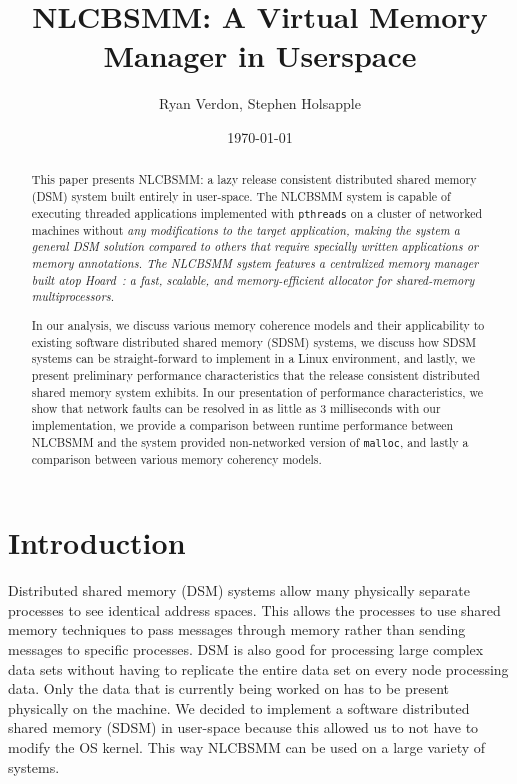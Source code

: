\documentclass[10pt,conference]{IEEEtran}
\begin{document}
\title{\vfill NLCBSMM: A Virtual Memory Manager in Userspace} 
\author{Ryan Verdon, Stephen Holsapple}
\date{\today}
\maketitle

\def \projname {NLCBSMM}
\newtheorem{definition}{Definition}[section]
\newtheorem{condition}{Condition}[section]

\begin{abstract}
This paper presents \projname{}: a lazy release consistent distributed shared memory (DSM) system built entirely in user-space.  The \projname{} system is capable of executing threaded applications implemented with \verb,pthreads, on a cluster of networked machines without \em any \em modifications to the target application, making the system a general DSM solution compared to others that require specially written applications or memory annotations.  The \projname{} system features a centralized memory manager~\cite{Li:1989:MCS:75104.75105} built atop Hoard~\cite{Berger:1999:HFS:899944, Berger:2000:HSM:356989.357000}: a fast, scalable, and memory-efficient allocator for shared-memory multiprocessors.

In our analysis, we discuss various memory coherence models and their applicability to existing software distributed shared memory (SDSM) systems, we discuss how SDSM systems can be straight-forward to implement in a Linux environment, and lastly, we present preliminary performance characteristics that the release consistent distributed shared memory system exhibits.  In our presentation of performance characteristics, we show that network faults can be resolved in as little as 3 milliseconds with our implementation, we provide a comparison between runtime performance between \projname{} and the system provided non-networked version of \verb,malloc,, and lastly a comparison between various memory coherency models.

\end{abstract}

\section{Introduction}

Distributed shared memory (DSM) systems allow many physically separate processes to see identical address spaces.  This allows the processes to use shared memory techniques to pass messages through memory rather than sending messages to specific processes.  DSM is also good for processing large complex data sets without having to replicate the entire data set on every node processing data.  Only the data that is currently being worked on has to be present physically on the machine.  We decided to implement a software distributed shared memory (SDSM) in user-space because this allowed us to not have to modify the OS kernel.  This way \projname{} can be used on a large variety of systems.  
\end{document}
